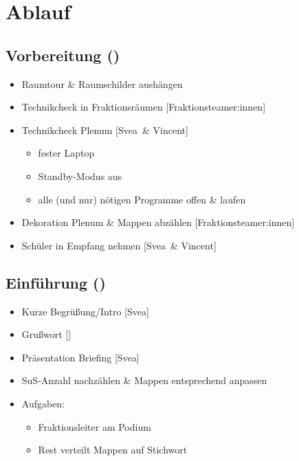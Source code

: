\documentclass{article}
\newcommand{\KOM}{Svea}
\newcommand{\EP}{Vincent}
\begin{document}
	\section{Ablauf}
	\subsection{Vorbereitung (\timeVorb)}
	\begin{itemize}
		\item Raumtour \& Raumschilder aushängen
        \item Technikcheck in Fraktionsräumen [Fraktionsteamer:innen]
		\item Technikcheck Plenum [\KOM\ \& \EP]
		\begin{itemize}
			\item fester Laptop
			\item Standby-Modus aus
			\item alle (und nur) nötigen Programme offen \& laufen
		\end{itemize}
		\item Dekoration Plenum \& Mappen abzählen [Fraktionsteamer:innen]
		\item Schüler in Empfang nehmen [\KOM\ \& \EP]
	\end{itemize}
	
	\subsection{Einführung (\timeEinf)}
	\begin{itemize}
		\item Kurze Begrüßung/Intro [\KOM]
		\item Grußwort [\EUVERTRETER]
		\item Präsentation Briefing [\KOM]
        \item SuS-Anzahl nachzählen \& Mappen entsprechend anpassen
        \item Aufgaben:
        \begin{itemize}
            \item Fraktionsleiter am Podium
            \item Rest verteilt Mappen auf Stichwort
        \end{itemize}
    \end{itemize}
	
\end{document}
